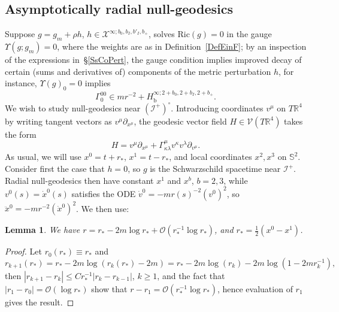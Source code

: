 \documentclass[reqno,11pt,letterpaper]{amsart}
\numberwithin{equation}{section}
\numberwithin{figure}{section}
\newtheorem{lemma}[thm]{Lemma}
\theoremstyle{definition}
\theoremstyle{remark}
\newcommand{\mc}{\mathcal}
\newcommand{\cO}{\mc O}
\newcommand{\cV}{\mc V}
\newcommand{\cX}{\mc X}
\newcommand{\ms}{\mathscr}
\newcommand{\scri}{\ms I}
\newcommand{\R}{\mathbb{R}}
\newcommand{\Sph}{\mathbb{S}}
\newcommand{\Ups}{\Upsilon}
\newcommand{\pa}{\partial}
\newcommand{\bop}{{\mathrm{b}}}
\newcommand{\half}{\tfrac{1}{2}}
\newcommand{\Hb}{H_{\bop}}
\newcommand{\Ric}{\mathrm{Ric}}
\begin{document}
\subsection{Asymptotically radial null-geodesics}
\label{SsLR}

Suppose $g=g_m+\rho h$, $h\in\cX^{\infty;b_0,b_I,b'_I,b_+}$, solves $\Ric(g)=0$ in the gauge $\Ups(g;g_m)=0$, where the weights are as in Definition~\ref{DefEinF}; by an inspection of the expressions in~\S\ref{SsCoPert}, the gauge condition implies improved decay of certain (sums and derivatives of) components of the metric perturbation $h$, for instance, $\Ups(g)_0=0$ implies
\begin{equation}
\label{EqLRGamma000}
  \Gamma_0^{0 0}\in m r^{-2}+\Hb^{\infty;2+b_0,2+b_I,2+b_+}.
\end{equation}
We wish to study null-geodesics near $(\scri^+)^\circ$. Introducing coordinates $v^\mu$ on $T\R^4$ by writing tangent vectors as $v^\mu\pa_{x^\mu}$, the geodesic vector field $H\in\cV(T\R^4)$ takes the form
\[
  H = v^\mu\pa_{x^\mu} + \Gamma^\mu_{\kappa\lambda}v^\kappa v^\lambda \pa_{v^\mu}.
\]
As usual, we will use $x^0=t+r_*$, $x^1=t-r_*$, and local coordinates $x^2,x^3$ on $\Sph^2$. Consider first the case that $h=0$, so $g$ is the Schwarzschild spacetime near $\scri^+$. Radial null-geodesics then have constant $x^1$ and $x^b$, $b=2,3$, while $v^0(s)=\dot x^0(s)$ satisfies the ODE $\dot v^0=-m r(s)^{-2}(v^0)^2$, so $\ddot x^0=-m r^{-2}(\dot x^0)^2$. We then use:

\begin{lemma}
\label{LemmaLRrstar}
  We have $r=r_*-2 m\log r_* + \cO(r_*^{-1}\log r_*)$, and $r_*=\half(x^0-x^1)$.
\end{lemma}
\begin{proof}
  Let $r_0(r_*)\equiv r_*$ and
  \[
    r_{k+1}(r_*)=r_*-2 m\log(r_k(r_*)-2 m)=r_*-2 m\log(r_k)-2 m\log(1-2 m r_k^{-1}),
  \]
  then $|r_{k+1}-r_k|\leq C r_*^{-1}|r_k-r_{k-1}|$, $k\geq 1$, and the fact that $|r_1-r_0|=\cO(\log r_*)$ show that $r-r_1=\cO(r_*^{-1}\log r_*)$, hence evaluation of $r_1$ gives the result.
\end{proof}
\end{document}
